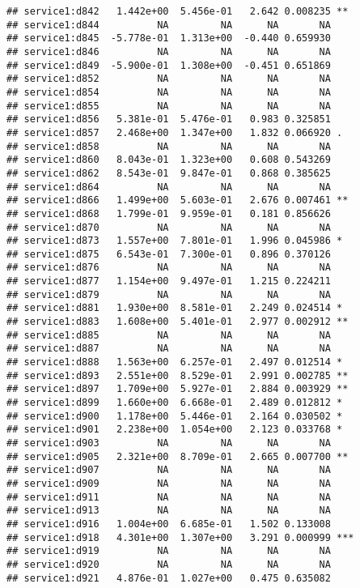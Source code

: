 \documentclass[
]{article}
\begin{document}
\begin{verbatim}
## service1:d842   1.442e+00  5.456e-01   2.642 0.008235 ** 
## service1:d844          NA         NA      NA       NA    
## service1:d845  -5.778e-01  1.313e+00  -0.440 0.659930    
## service1:d846          NA         NA      NA       NA    
## service1:d849  -5.900e-01  1.308e+00  -0.451 0.651869    
## service1:d852          NA         NA      NA       NA    
## service1:d854          NA         NA      NA       NA    
## service1:d855          NA         NA      NA       NA    
## service1:d856   5.381e-01  5.476e-01   0.983 0.325851    
## service1:d857   2.468e+00  1.347e+00   1.832 0.066920 .  
## service1:d858          NA         NA      NA       NA    
## service1:d860   8.043e-01  1.323e+00   0.608 0.543269    
## service1:d862   8.543e-01  9.847e-01   0.868 0.385625    
## service1:d864          NA         NA      NA       NA    
## service1:d866   1.499e+00  5.603e-01   2.676 0.007461 ** 
## service1:d868   1.799e-01  9.959e-01   0.181 0.856626    
## service1:d870          NA         NA      NA       NA    
## service1:d873   1.557e+00  7.801e-01   1.996 0.045986 *  
## service1:d875   6.543e-01  7.300e-01   0.896 0.370126    
## service1:d876          NA         NA      NA       NA    
## service1:d877   1.154e+00  9.497e-01   1.215 0.224211    
## service1:d879          NA         NA      NA       NA    
## service1:d881   1.930e+00  8.581e-01   2.249 0.024514 *  
## service1:d883   1.608e+00  5.401e-01   2.977 0.002912 ** 
## service1:d885          NA         NA      NA       NA    
## service1:d887          NA         NA      NA       NA    
## service1:d888   1.563e+00  6.257e-01   2.497 0.012514 *  
## service1:d893   2.551e+00  8.529e-01   2.991 0.002785 ** 
## service1:d897   1.709e+00  5.927e-01   2.884 0.003929 ** 
## service1:d899   1.660e+00  6.668e-01   2.489 0.012812 *  
## service1:d900   1.178e+00  5.446e-01   2.164 0.030502 *  
## service1:d901   2.238e+00  1.054e+00   2.123 0.033768 *  
## service1:d903          NA         NA      NA       NA    
## service1:d905   2.321e+00  8.709e-01   2.665 0.007700 ** 
## service1:d907          NA         NA      NA       NA    
## service1:d909          NA         NA      NA       NA    
## service1:d911          NA         NA      NA       NA    
## service1:d913          NA         NA      NA       NA    
## service1:d916   1.004e+00  6.685e-01   1.502 0.133008    
## service1:d918   4.301e+00  1.307e+00   3.291 0.000999 ***
## service1:d919          NA         NA      NA       NA    
## service1:d920          NA         NA      NA       NA    
## service1:d921   4.876e-01  1.027e+00   0.475 0.635082    

\end{verbatim}
\end{document}
